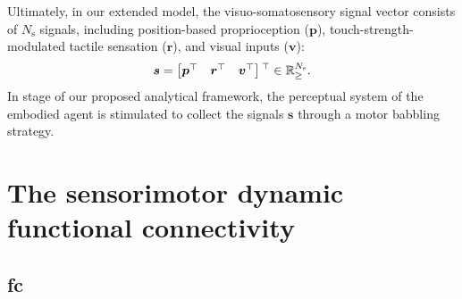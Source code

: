 Ultimately, in our extended model, the visuo-somatosensory signal vector consists of $N_\text{s}$ signals, including position-based proprioception ($\bm{p}$), touch-strength-modulated tactile sensation ($\bm{r}$), and visual inputs ($\bm{v}$):  
\begin{equation}
	\bm{s} = \begin{bmatrix}
		\bm{p}{^{\top}} & \bm{r}{^{\top}} & \bm{v}{^{\top}}
	\end{bmatrix}{^{\top}} \in \mathbb{R}^{N_\text{s}}_{\geq}.
\end{equation}
In stage  of our proposed analytical framework, the perceptual system of the embodied agent is stimulated to collect the signals $\bm{s}$ through a motor babbling strategy.

\section{The sensorimotor dynamic functional connectivity}

\subsection{\Acl{fc}}


